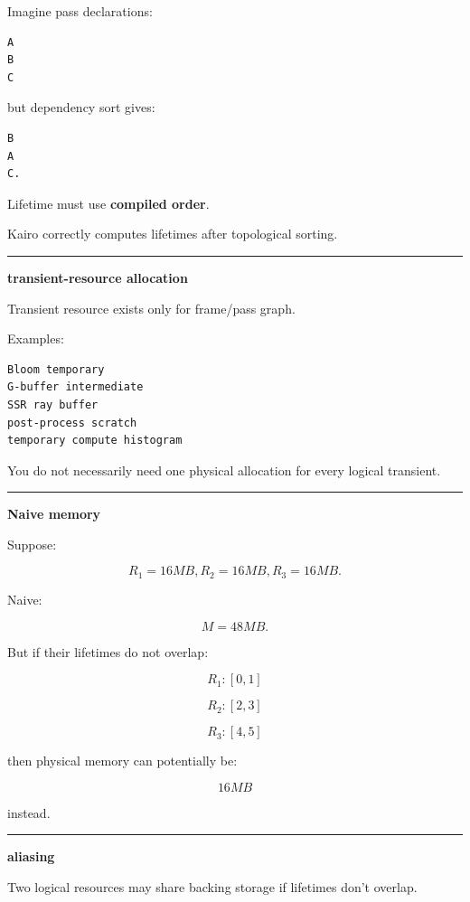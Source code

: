 Imagine pass declarations:

\begin{verbatim}
A
B
C
\end{verbatim}

but dependency sort gives:

\begin{verbatim}
B
A
C.
\end{verbatim}

Lifetime must use \textbf{compiled order}.

Kairo correctly computes lifetimes after topological sorting.

\begin{center}\rule{0.5\linewidth}{0.5pt}\end{center}

\textbf{transient-resource allocation}

Transient resource exists only for frame/pass graph.

Examples:

\begin{verbatim}
Bloom temporary
G-buffer intermediate
SSR ray buffer
post-process scratch
temporary compute histogram
\end{verbatim}

You do not necessarily need one physical allocation for every logical transient.

\begin{center}\rule{0.5\linewidth}{0.5pt}\end{center}

\textbf{Naive memory}

Suppose:

\[
R_1=16MB,
R_2=16MB,
R_3=16MB.
\]

Naive:

\[
M=48MB.
\]

But if their lifetimes do not overlap:

\[
R_1:[0,1]
\]

\[
R_2:[2,3]
\]

\[
R_3:[4,5]
\]

then physical memory can potentially be:

\[
\boxed{16MB}
\]

instead.

\begin{center}\rule{0.5\linewidth}{0.5pt}\end{center}

\textbf{aliasing}

Two logical resources may share backing storage if lifetimes don't overlap.

